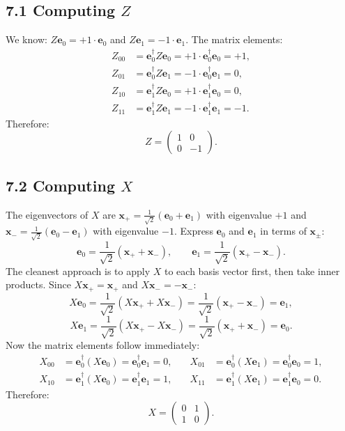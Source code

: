 \documentclass[12pt,a4paper]{article}
\begin{document}
\subsection{7.1 Computing $Z$}
We know: $Z\mathbf{e}_0=+1\cdot\mathbf{e}_0$ and $Z\mathbf{e}_1=-1\cdot\mathbf{e}_1$.  The matrix elements:
\begin{align}
    Z_{00} &= \mathbf{e}_0^\dagger Z\mathbf{e}_0 = +1\cdot\mathbf{e}_0^\dagger\mathbf{e}_0 = +1, \\
    Z_{01} &= \mathbf{e}_0^\dagger Z\mathbf{e}_1 = -1\cdot\mathbf{e}_0^\dagger\mathbf{e}_1 = 0, \\
    Z_{10} &= \mathbf{e}_1^\dagger Z\mathbf{e}_0 = +1\cdot\mathbf{e}_1^\dagger\mathbf{e}_0 = 0, \\
    Z_{11} &= \mathbf{e}_1^\dagger Z\mathbf{e}_1 = -1\cdot\mathbf{e}_1^\dagger\mathbf{e}_1 = -1.
\end{align}
Therefore:
\[
    Z = \begin{pmatrix}1&0\\0&-1\end{pmatrix}.
\]

\subsection{7.2 Computing $X$}
The eigenvectors of $X$ are $\mathbf{x}_+=\frac{1}{\sqrt{2}}(\mathbf{e}_0+\mathbf{e}_1)$ with eigenvalue $+1$ and $\mathbf{x}_-=\frac{1}{\sqrt{2}}(\mathbf{e}_0-\mathbf{e}_1)$ with eigenvalue $-1$.  Express $\mathbf{e}_0$ and $\mathbf{e}_1$ in terms of $\mathbf{x}_\pm$:
\[
    \mathbf{e}_0 = \frac{1}{\sqrt{2}}(\mathbf{x}_++\mathbf{x}_-), \qquad
    \mathbf{e}_1 = \frac{1}{\sqrt{2}}(\mathbf{x}_+-\mathbf{x}_-).
\]
The cleanest approach is to apply $X$ to each basis vector first, then take inner products.  Since $X\mathbf{x}_+=\mathbf{x}_+$ and $X\mathbf{x}_-=-\mathbf{x}_-$:
\[
    X\mathbf{e}_0 = \frac{1}{\sqrt{2}}(X\mathbf{x}_++X\mathbf{x}_-) = \frac{1}{\sqrt{2}}(\mathbf{x}_+-\mathbf{x}_-) = \mathbf{e}_1,
\]
\[
    X\mathbf{e}_1 = \frac{1}{\sqrt{2}}(X\mathbf{x}_+-X\mathbf{x}_-) = \frac{1}{\sqrt{2}}(\mathbf{x}_++\mathbf{x}_-) = \mathbf{e}_0.
\]
Now the matrix elements follow immediately:
\begin{align}
    X_{00} &= \mathbf{e}_0^\dagger(X\mathbf{e}_0) = \mathbf{e}_0^\dagger\mathbf{e}_1 = 0, &\quad
    X_{01} &= \mathbf{e}_0^\dagger(X\mathbf{e}_1) = \mathbf{e}_0^\dagger\mathbf{e}_0 = 1, \\[4pt]
    X_{10} &= \mathbf{e}_1^\dagger(X\mathbf{e}_0) = \mathbf{e}_1^\dagger\mathbf{e}_1 = 1, &\quad
    X_{11} &= \mathbf{e}_1^\dagger(X\mathbf{e}_1) = \mathbf{e}_1^\dagger\mathbf{e}_0 = 0.
\end{align}
Therefore:
\[
    X = \begin{pmatrix}0&1\\1&0\end{pmatrix}.
\]
\end{document}

